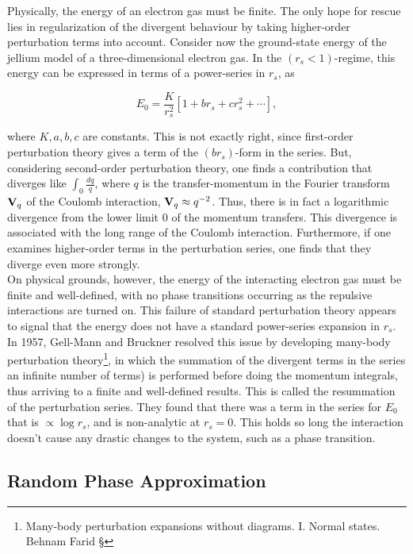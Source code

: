 Physically, the energy of an electron gas must be finite. The only hope for rescue lies in regularization of the divergent behaviour by taking higher-order perturbation terms into account. Consider now the ground-state energy of the jellium model of a three-dimensional electron gas. In the $(r_s < 1)$-regime, this energy can be expressed in terms of a power-series in $r_s$, as

$$
    E_0 = \frac{K}{r_s^2} [1+ br_s + c r_s^2 + \cdots],
$$

where $K, a,b,c$ are constants. This is not exactly right, since first-order perturbation theory gives a term of the $(br_s)$-form in the series. But, considering second-order perturbation theory, one finds a contribution that diverges like $\int_0 \frac{dq}{q}$, where $q$ is the transfer-momentum in the Fourier transform ${\bf V}_q$ of the Coulomb interaction, ${\bf V}_q \approx q^{-2}$. Thus, there is in fact a logarithmic divergence from the lower limit $0$ of the momentum transfers. This divergence is associated with the long range of the Coulomb interaction. Furthermore, if one examines higher-order terms in the perturbation series, one finds that they diverge even more strongly. \\

On physical grounds, however, the energy of the interacting electron gas must be finite and well-defined, with no phase transitions occurring as the repulsive interactions are turned on. This failure of standard perturbation theory appears to signal that the energy does not have a standard power-series expansion in $r_s$. In 1957, Gell-Mann and Bruckner resolved this issue by developing many-body perturbation theory\footnote{Many-body perturbation expansions without diagrams.
I. Normal states. Behnam Farid §}, in which the summation of the divergent terms in the series an infinite number of terms) is performed before doing the momentum integrals, thus arriving to a finite and well-defined results. This is called the resummation of the perturbation series. They found that there was a term in the series for $E_0$ that is $\propto \log r_s$, and is non-analytic at $r_s = 0$. This holds so long the interaction doesn't cause any drastic changes to the system, such as a phase transition. \\

\subsection{Random Phase Approximation}

